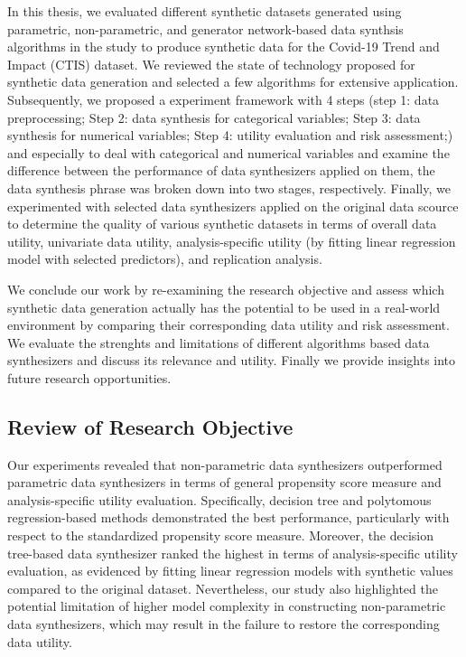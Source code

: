 In this thesis, we evaluated different synthetic datasets generated using parametric, non-parametric, and generator network-based data synthsis algorithms in the study to produce synthetic data for the Covid-19 Trend and Impact (CTIS) dataset. We reviewed the state of technology proposed for synthetic data generation and selected a few algorithms for extensive application. Subsequently, we proposed a experiment framework with 4 steps (step 1: data preprocessing; Step 2: data synthesis for categorical variables; Step 3: data synthesis for numerical variables; Step 4: utility evaluation and risk assessment;) and especially to deal with categorical and numerical variables and examine the difference between the performance of data synthesizers applied on them, the data synthesis phrase was broken down into two stages, respectively. Finally, we experimented with selected data synthesizers applied on the original data scource to determine the quality of various synthetic datasets in terms of overall data utility, univariate data utility, analysis-specific utility (by fitting linear regression model with selected predictors), and replication analysis.

We conclude our work by re-examining the research objective and assess which synthetic data generation actually has the potential to be used in a real-world environment by comparing their corresponding data utility and risk assessment. We evaluate the strenghts and limitations of different algorithms based data synthesizers and discuss its relevance and utility. Finally we provide insights into future research opportunities.

\subsection{Review of Research Objective}
\label{subsec:review}
Our experiments revealed that non-parametric data synthesizers outperformed parametric data synthesizers in terms of general propensity score measure and analysis-specific utility evaluation. Specifically, decision tree and polytomous regression-based methods demonstrated the best performance, particularly with respect to the standardized propensity score measure. Moreover, the decision tree-based data synthesizer ranked the highest in terms of analysis-specific utility evaluation, as evidenced by fitting linear regression models with synthetic values compared to the original dataset. Nevertheless, our study also highlighted the potential limitation of higher model complexity in constructing non-parametric data synthesizers, which may result in the failure to restore the corresponding data utility.

